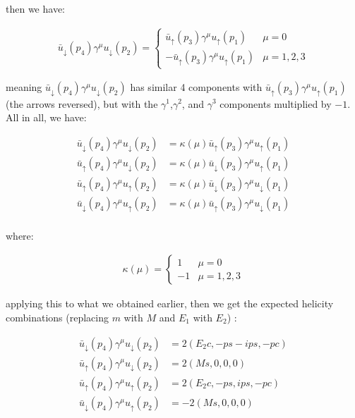 \documentclass[11pt]{article}
\theoremstyle{definition}
\begin{document}
then we have:

\begin{align}
    \bar{u}_{\downarrow}(p_4) \gamma^{\mu} u_{\downarrow}(p_2)  =
    \begin{cases}
        \bar{u}_{\uparrow}(p_3)\gamma^{\mu} u_{\uparrow}(p_1) & \mu = 0\\
        -\bar{u}_{\uparrow}(p_3)\gamma^{\mu} u_{\uparrow}(p_1) & \mu = 1,2,3
    \end{cases}
\end{align}

meaning $\bar{u}_{\downarrow}(p_4) \gamma^{\mu} u_{\downarrow}(p_2)$ has similar 4 components with $\bar{u}_{\uparrow}(p_3)\gamma^{\mu} u_{\uparrow}(p_1)$ (the arrows reversed), but with the $\gamma^1$,$\gamma^2$, and $\gamma^3$ components multiplied by $-1$. All in all, we have:

\begin{align}
    \bar{u}_{\downarrow}(p_4) \gamma^{\mu} u_{\downarrow}(p_2) 
    &=
    \kappa(\mu)\bar{u}_{\uparrow}(p_3)\gamma^{\mu} u_{\uparrow}(p_1)\\
    \bar{u}_{\uparrow}(p_4) \gamma^{\mu} u_{\downarrow}(p_2) 
    &=
    \kappa(\mu)\bar{u}_{\downarrow}(p_3) \gamma^{\mu} u_{\uparrow}(p_1)\\
    \bar{u}_{\uparrow}(p_4) \gamma^{\mu} u_{\uparrow}(p_2)
    &=
    \kappa(\mu)\bar{u}_{\downarrow}(p_3) \gamma^{\mu} u_{\downarrow}(p_1)\\
    \bar{u}_{\downarrow}(p_4) \gamma^{\mu} u_{\uparrow}(p_2)
    &= 
    \kappa(\mu) \bar{u}_{\uparrow}(p_3) \gamma^{\mu} u_{\downarrow}(p_1)\\
\end{align}

where: %

\begin{align}
    \kappa(\mu)  =
    \begin{cases}
        1 & \mu = 0\\
        -1 & \mu = 1,2,3
    \end{cases}
\end{align}

applying this to what we obtained earlier, then we get the expected helicity combinations (replacing $m$ with $M$ and $E_1$ with $E_2$) :

\begin{equation*}
\boxed{
    \begin{aligned}
    \bar{u}_{\downarrow}(p_4) \gamma^{\mu} u_{\downarrow}(p_2) 
    &=
    2(E_2c, -ps -ips, -pc)\\
    \bar{u}_{\uparrow}(p_4) \gamma^{\mu} u_{\downarrow}(p_2) 
    &=
    2(Ms, 0, 0, 0)\\
    \bar{u}_{\uparrow}(p_4) \gamma^{\mu} u_{\uparrow}(p_2)
    &=
    2(E_2c, -ps, ips, -pc)\\
    \bar{u}_{\downarrow}(p_4) \gamma^{\mu} u_{\uparrow}(p_2)
    &= 
    -2(Ms,0,0,0)\\
    \end{aligned}
}
\end{equation*}
\end{document}
